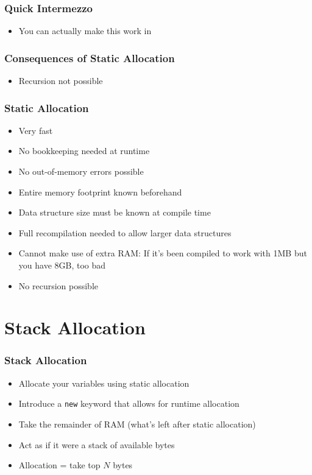 \documentclass{../ucll-slides}
\newenvironment{procontralist}{
  \begingroup
  \newcommand{\pro}{\item[\Checkmark]}
  \newcommand{\con}{\item[\XSolidBrush]}
  \begin{itemize}
  }{
  \end{itemize}
  \endgroup}
\begin{document}
\begin{frame}
  \frametitle{Quick Intermezzo}
  \begin{itemize}
    \item You can actually make this work in \cpp
  \end{itemize}
\end{frame}


\begin{frame}
  \frametitle{Consequences of Static Allocation}
  \notrealcpp
  \begin{itemize}
    \item Recursion not possible
  \end{itemize}
\end{frame}

\begin{frame}
  \frametitle{Static Allocation}
  \begin{procontralist}
    \pro Very fast
    \pro No bookkeeping needed at runtime
    \pro No out-of-memory errors possible
    \pro Entire memory footprint known beforehand
    \con Data structure size must be known at compile time
    \con Full recompilation needed to allow larger data structures
    \con Cannot make use of extra RAM:
         If it's been compiled to work with 1MB but you have 8GB, too bad
    \con No recursion possible
  \end{procontralist}
\end{frame}

\section{Stack Allocation}

\begin{frame}
  \tableofcontents[currentsection]
\end{frame}

\begin{frame}
  \frametitle{Stack Allocation}
  \begin{itemize}
    \item Allocate your variables using static allocation
    \item Introduce a {\tt new} keyword that allows for runtime allocation
    \item Take the remainder of RAM (what's left after static allocation)
    \item Act as if it were a stack of available bytes
    \item Allocation = take top $N$ bytes
  \end{itemize}
  \vskip5mm
  \begin{center}
  \end{center}
\end{frame}
\end{document}
